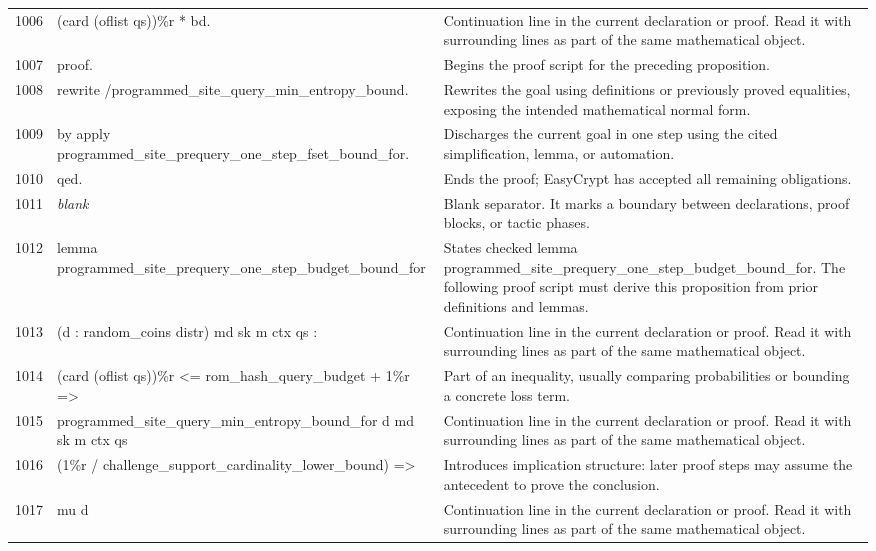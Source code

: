 \documentclass[10pt]{article}
\begin{document}
\begin{longtable}{r L{0.53\textwidth} L{0.37\textwidth}}
1006 & {\ttfamily\scriptsize   (card (oflist qs))\%r * bd.} & Continuation line in the current declaration or proof.  Read it with surrounding lines as part of the same mathematical object. \\
1007 & {\ttfamily\scriptsize proof.} & Begins the proof script for the preceding proposition. \\
1008 & {\ttfamily\scriptsize rewrite /programmed\_site\_query\_min\_entropy\_bound.} & Rewrites the goal using definitions or previously proved equalities, exposing the intended mathematical normal form. \\
1009 & {\ttfamily\scriptsize by apply programmed\_site\_prequery\_one\_step\_fset\_bound\_for.} & Discharges the current goal in one step using the cited simplification, lemma, or automation. \\
1010 & {\ttfamily\scriptsize qed.} & Ends the proof; EasyCrypt has accepted all remaining obligations. \\
1011 & {\ttfamily\scriptsize \emph{blank}} & Blank separator.  It marks a boundary between declarations, proof blocks, or tactic phases. \\
1012 & {\ttfamily\scriptsize lemma programmed\_site\_prequery\_one\_step\_budget\_bound\_for} & States checked lemma programmed\_site\_prequery\_one\_step\_budget\_bound\_for.  The following proof script must derive this proposition from prior definitions and lemmas. \\
1013 & {\ttfamily\scriptsize   (d : random\_coins distr) md sk m ctx qs :} & Continuation line in the current declaration or proof.  Read it with surrounding lines as part of the same mathematical object. \\
1014 & {\ttfamily\scriptsize   (card (oflist qs))\%r <= rom\_hash\_query\_budget + 1\%r =>} & Part of an inequality, usually comparing probabilities or bounding a concrete loss term. \\
1015 & {\ttfamily\scriptsize   programmed\_site\_query\_min\_entropy\_bound\_for d md sk m ctx qs} & Continuation line in the current declaration or proof.  Read it with surrounding lines as part of the same mathematical object. \\
1016 & {\ttfamily\scriptsize     (1\%r / challenge\_support\_cardinality\_lower\_bound) =>} & Introduces implication structure: later proof steps may assume the antecedent to prove the conclusion. \\
1017 & {\ttfamily\scriptsize   mu d} & Continuation line in the current declaration or proof.  Read it with surrounding lines as part of the same mathematical object. \\

\end{longtable}
\end{document}
